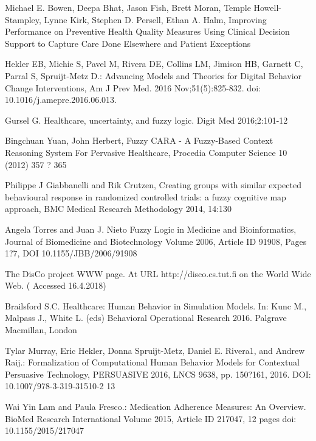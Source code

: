 \documentclass{llncs}
\begin{document}

\begin{thebibliography}{99}


 Michael E. Bowen, Deepa Bhat, Jason Fish, Brett Moran, Temple Howell-Stampley, Lynne Kirk, Stephen D. Persell, Ethan A. Halm, Improving Performance on Preventive Health Quality Measures Using Clinical Decision Support to Capture Care Done Elsewhere and Patient Exceptions

 Hekler EB, Michie S, Pavel M, Rivera DE, Collins LM, Jimison HB, Garnett C, Parral S, Spruijt-Metz D.: Advancing Models and Theories for Digital Behavior Change Interventions, Am J Prev Med. 2016 Nov;51(5):825-832. doi: 10.1016/j.amepre.2016.06.013.

 Gursel G. Healthcare, uncertainty, and fuzzy logic. Digit Med 2016;2:101-12

 Bingchuan Yuan, John Herbert, Fuzzy CARA - A Fuzzy-Based Context Reasoning System For Pervasive Healthcare,  Procedia Computer Science 10 (2012) 357 ? 365

 Philippe J Giabbanelli and Rik Crutzen, Creating groups with similar expected behavioural response in randomized controlled trials: a fuzzy cognitive map approach, BMC Medical Research Methodology 2014, 14:130

 Angela Torres and Juan J. Nieto Fuzzy Logic in Medicine and Bioinformatics, Journal of Biomedicine and Biotechnology Volume 2006, Article ID 91908, Pages 1?7, DOI 10.1155/JBB/2006/91908

 The DisCo project WWW page. At URL http://disco.cs.tut.fi on the World Wide Web. ( Accessed 16.4.2018)

 Brailsford S.C. Healthcare: Human Behavior in Simulation Models. In: Kunc M., Malpass J., White L. (eds) Behavioral Operational Research 2016. Palgrave Macmillan, London

 Tylar Murray, Eric Hekler, Donna Spruijt-Metz, Daniel E. Rivera1, and Andrew Raij.: Formalization of Computational Human Behavior Models for Contextual Persuasive Technology, PERSUASIVE 2016, LNCS 9638, pp. 150?161, 2016. DOI: 10.1007/978-3-319-31510-2 13

 Wai Yin Lam and Paula Fresco.: Medication Adherence Measures: An Overview. BioMed Research International Volume 2015, Article ID 217047, 12 pages doi: 10.1155/2015/217047


\end{thebibliography}
\end{document}
